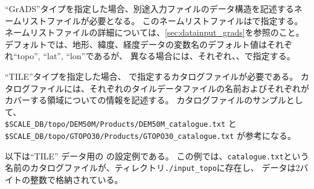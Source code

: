 ``GrADS''タイプを指定した場合、別途入力ファイルのデータ構造を記述するネームリストファイルが必要となる。
このネームリストファイルはで指定する。
ネームリストファイルの詳細については、\ref{sec:datainput_grads}を参照のこと。
デフォルトでは、地形、緯度、経度データの変数名のデフォルト値はそれぞれ``topo'', ``lat'', ``lon''であるが、
異なる場合には、それぞれ、、で指定する。


``TILE''タイプを指定した場合、 で指定するカタログファイルが必要である。
カタログファイルには、それぞれのタイルデータファイルの名前およびそれぞれがカバーする領域についての情報を記述する。
カタログファイルのサンプルとして、\\ \verb|$SCALE_DB/topo/DEM50M/Products/DEM50M_catalogue.txt| と\\
\verb|$SCALE_DB/topo/GTOPO30/Products/GTOPO30_catalogue.txt| が参考になる。

以下は``TILE'' データ用の  の設定例である。
この例では、\verb|catalogue.txt|という名前のカタログファイルが、ティレクトリ\verb|./input_topo|に存在し、
データは2バイトの整数で格納されている。

